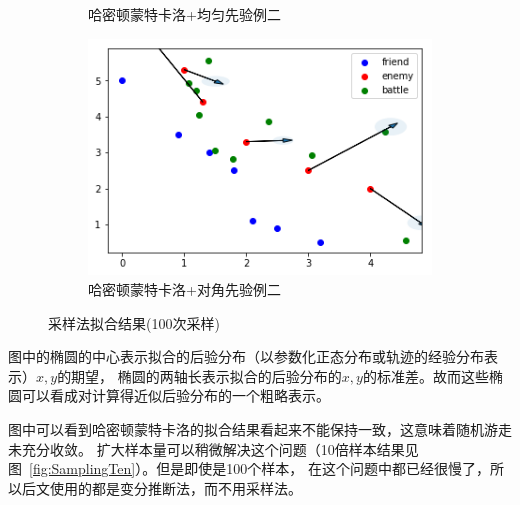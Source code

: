 \documentclass{article}
\begin{document}
\begin{figure}[ht]
\begin{subfigure}[b]{0.45\linewidth}
    \caption{哈密顿蒙特卡洛+均匀先验例二}
  \end{subfigure}
  \begin{subfigure}[b]{0.45\linewidth}
    \includegraphics[width=\linewidth]{Sampling22.png}
    \caption{哈密顿蒙特卡洛+对角先验例二}
  \end{subfigure}
  \caption{采样法拟合结果(100次采样)}
  \label{fig:samping}
\end{figure}

图中的椭圆的中心表示拟合的后验分布（以参数化正态分布或轨迹的经验分布表示）$x,y$的期望，
椭圆的两轴长表示拟合的后验分布的$x,y$的标准差。故而这些椭圆可以看成对计算得近似后验分布的一个粗略表示。

图中可以看到哈密顿蒙特卡洛的拟合结果看起来不能保持一致，这意味着随机游走未充分收敛。
扩大样本量可以稍微解决这个问题（10倍样本结果见图~\ref{fig:SamplingTen}）。但是即使是100个样本，
在这个问题中都已经很慢了，所以后文使用的都是变分推断法，而不用采样法。
\end{document}
